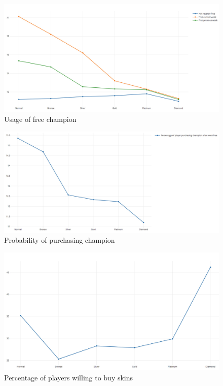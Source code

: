 \documentclass[sigconf]{acmart}
\begin{document}
\begin{figure}[htb]
\centering
\includegraphics[width=1.0\columnwidth]{images/WechatIMG112.jpeg}
\caption{Usage of free champion}
\label{Figure 1}
\end{figure}
\begin{figure}[htb]
\centering
\includegraphics[width=1.0\columnwidth]{images/WechatIMG114.jpeg}
\caption{Probability of purchasing champion}
\label{Figure 2}
\end{figure}
\begin{figure}[htb]
\centering
\includegraphics[width=1.0\columnwidth]{images/WechatIMG115.jpeg}
\caption{Percentage of players willing to buy skins}
\label{Figure 3}
\end{figure}
\end{document}
